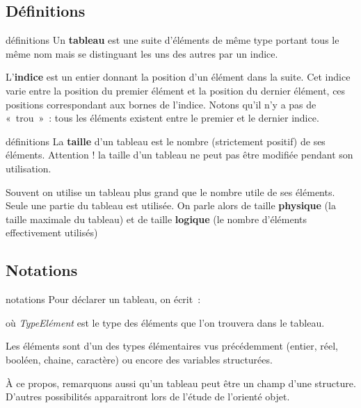 \subsection{Définitions}

\begin{frame}{définitions}
	Un \textbf{tableau} est une suite d’éléments de même type 
	portant tous le même nom mais se distinguant 
	les uns des autres par un indice.

	L’\textbf{indice} est un entier 
	donnant la position d’un élément dans la suite. 
	Cet indice varie entre la position du premier élément 
	et la position du dernier élément, 
	ces positions correspondant aux bornes de l’indice.
	Notons qu'il n'y a pas de «~trou~»~: 
	tous les éléments existent entre le premier et le dernier indice.

\end{frame}

\begin{frame}{définitions}
	La \textbf{taille} d’un tableau 
	est le nombre (strictement positif) de ses éléments.
	Attention ! la taille d’un tableau ne peut pas être modifiée pendant
	son utilisation.

	Souvent on utilise un tableau plus grand que
	le nombre utile de ses éléments. 
	Seule une partie du tableau est utilisée. 
	On parle alors de taille \textbf{physique}
	(la taille maximale du tableau) 
	et de taille \textbf{logique}
	(le nombre d'éléments effectivement utilisés)
\end{frame}

\subsection{Notations}

\begin{frame}{notations}
	Pour déclarer un tableau, on écrit~:

	
	où \textit{TypeElément} est le type des éléments que l’on
	trouvera dans le tableau. 
	
	\bigskip
	
	Les éléments sont d’un des types élémentaires
	vus précédemment (entier, réel, booléen, chaine, caractère) ou encore
	des variables structurées. 
	
	\bigskip
	
	À ce propos, remarquons aussi
	qu'un tableau peut être un champ d'une structure. 
	D'autres possibilités apparaitront lors de l'étude de
	l'orienté objet.

\end{frame}

